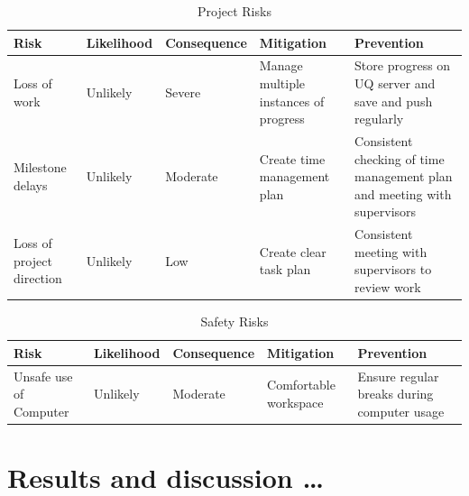 \documentclass[12pt,openany,a4paper]{book}
\newcommand{\tab}[1]  {Table~\ref{#1}}		%
\begin{document}
\begin{table}[ht]
    \begin{center}
        \begin{tabular}{ |p{2cm}|p{2.1cm}|p{2.6cm}|p{4cm}|p{4cm}| }
            \hline
            \textbf{Risk} & \textbf{Likelihood} & \textbf{Consequence} & \textbf{Mitigation} & \textbf{Prevention}\\
            \hline
            Loss of work & Unlikely & Severe & Manage multiple instances of progress & Store progress on UQ server and save and push regularly\\
            \hline
            Milestone delays & Unlikely & Moderate & Create time management plan & Consistent checking of time management plan and meeting with supervisors\\
            \hline
            Loss of project direction & Unlikely & Low & Create clear task plan & Consistent meeting with supervisors to review work\\
            \hline
        \end{tabular}
        \caption{Project Risks}
        \label{project-risk-table}
    \end{center}
\end{table}

\begin{table}[ht]
    \begin{center}
        \begin{tabular}{ |p{2cm}|p{2.1cm}|p{2.6cm}|p{4cm}|p{4cm}| }
            \hline
            \textbf{Risk} & \textbf{Likelihood} & \textbf{Consequence} & \textbf{Mitigation} & \textbf{Prevention}\\
            \hline
            Unsafe use of Computer & Unlikely & Moderate & Comfortable workspace & Ensure regular breaks during computer usage\\
            \hline
        \end{tabular}
        \caption{Safety Risks}
        \label{safety-risk-table}
    \end{center}
\end{table}
\chapter{Results and discussion \ldots}
% 
% 
% 
% 
\end{document}
